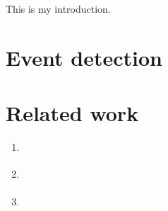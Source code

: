This is my introduction.

\section{Event detection}

\section{Related work}
\begin{enumerate}
\item \cite{event-detection}
\item \cite{parameter-free}
\item \cite{retrospective-online-study}

\end{enumerate}